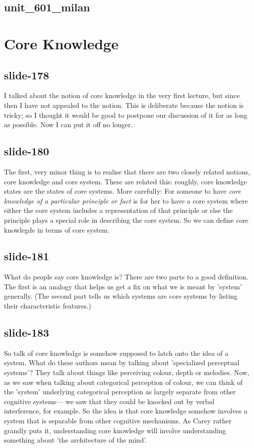 \documentclass[12pt,\papersize]{extarticle}
\begin{document}
 
\subsection{unit\_601\_milan}
 
\section{Core Knowledge}
 
 
\subsection{slide-178}
I talked about the notion of core knowledge in the very first lecture, but since then I have not appealed to the notion. This is deliberate because the notion is tricky; so I thought it would be good to postpone our discussion of it for as long as possible. Now I can put it off no longer.
 
 
\subsection{slide-180}
The first, very minor thing is to realise that there are two closely related notions, core knowledge and core system. These are related this: roughly, core knowledge states are the states of core systems. More carefully:
For someone to have \textit{core knowledge of a particular principle or fact} is for her to have a core system where either the core system includes a representation of that principle or else the principle plays a special role in describing the core system.
So we can define core knowlegde in terms of core system.
 
 
\subsection{slide-181}
What do people say core knowledge is?
There are two parts to a good definition. The first is an analogy that helps us get a fix on what we is meant by 'system' generally. (The second part tells us which systems are core systems by listing their characteristic features.)
 
 
\subsection{slide-183}
So talk of core knowledge is somehow supposed to latch onto the idea of a system.
What do these authors mean by talking about 'specialized perceptual systems'?
They talk about things like perceiving colour, depth or melodies.
Now, as we saw when talking about categorical perception of colour, we can think of the 'system' underlying categorical perception as largely separate from other cognitive systems--- we saw that they could be knocked out by verbal interference, for example.
So the idea is that core knowledge somehow involves a system that is separable from other cognitive mechanisms.
As Carey rather grandly puts it, understanding core knowledge will involve understanding something about 'the architecture of the mind'.
 
\end{document}
